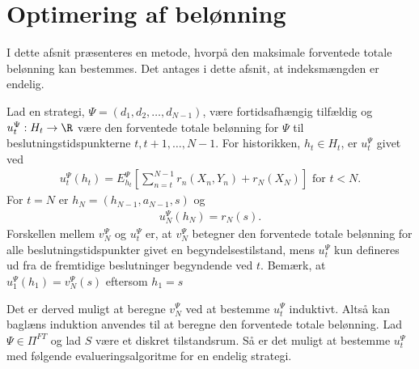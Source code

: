 \section{Optimering af belønning}\label{afsnit:optimering_af_belønning}
I dette afsnit præsenteres en metode, hvorpå den maksimale forventede totale belønning kan bestemmes. Det antages i dette afsnit, at indeksmængden er endelig.

Lad en strategi, $\Psi = (d_1,d_2, \ldots, d_{N-1})$, være fortidsafhængig tilfældig og $u_t^\Psi: H_t \to \R$ være den forventede totale belønning for $\Psi$ til beslutningstidspunkterne $t, t+1, \ldots, N-1$. For historikken, $h_t \in H_t$, er $u_t^\Psi$ givet ved 
% 
\begin{align}\label{eq:forventede_totale_belønning} 
    u_t^{\Psi}(h_t)=E^{\Psi}_{h_t}\left[\sum^{N-1}_{n=t}r_n(X_n, Y_n)+r_N(X_N)\right] \text{ for } t < N. 
\end{align}
For $t=N$ er $h_N=(h_{N-1},a_{N-1},s)$ og
\begin{align}\label{eq:u_N=r_N}
    u_N^{\Psi}(h_N)=r_N(s).
\end{align}
Forskellen mellem $v_N^\Psi$ og $u_t^\Psi$ er, at $v_N^\Psi$ betegner den forventede totale belønning for alle beslutningstidspunkter givet en begyndelsestilstand, mens $u_t^\Psi$ kun defineres ud fra de fremtidige beslutninger begyndende ved $t$. Bemærk, at $u_1^\Psi(h_1) = v_N^\Psi(s)$ eftersom $h_1 = s$


Det er derved muligt at beregne $v_N^\Psi$ ved at bestemme $u_t^{\Psi}$ induktivt. Altså kan baglæns induktion anvendes til at beregne den forventede totale belønning.
Lad $\Psi\in \Pi^{FT}$ og lad $S$ være et diskret tilstandsrum. Så er det muligt at bestemme $u_t^\Psi$ med følgende evalueringsalgoritme for en endelig strategi. %

